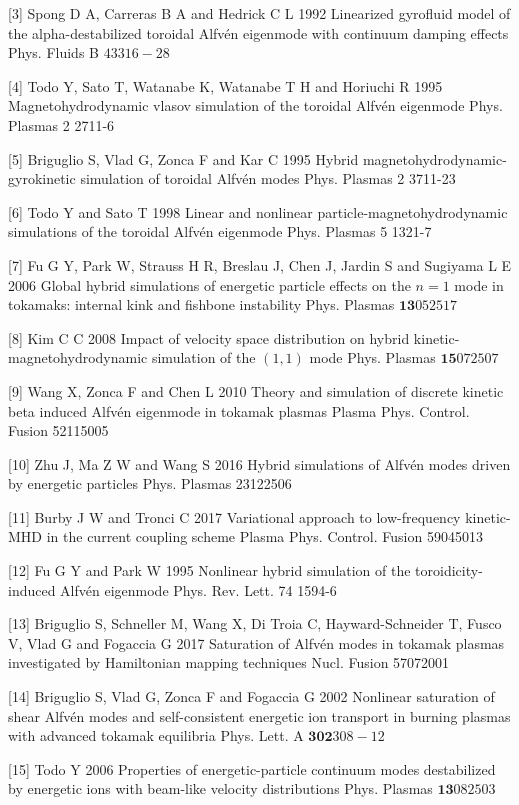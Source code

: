 \documentclass[10pt]{article}
\begin{document}
[3] Spong D A, Carreras B A and Hedrick C L 1992 Linearized gyrofluid model of the alpha-destabilized toroidal Alfvén eigenmode with continuum damping effects Phys. Fluids B $43316-28$

[4] Todo Y, Sato T, Watanabe K, Watanabe T H and Horiuchi R 1995 Magnetohydrodynamic vlasov simulation of the toroidal Alfvén eigenmode Phys. Plasmas 2 2711-6

[5] Briguglio S, Vlad G, Zonca F and Kar C 1995 Hybrid magnetohydrodynamic-gyrokinetic simulation of toroidal Alfvén modes Phys. Plasmas 2 3711-23

[6] Todo Y and Sato T 1998 Linear and nonlinear particle-magnetohydrodynamic simulations of the toroidal Alfvén eigenmode Phys. Plasmas 5 1321-7

[7] Fu G Y, Park W, Strauss H R, Breslau J, Chen J, Jardin S and Sugiyama L E 2006 Global hybrid simulations of energetic particle effects on the $n=1$ mode in tokamaks: internal kink and fishbone instability Phys. Plasmas $\mathbf{1 3} 052517$

[8] Kim C C 2008 Impact of velocity space distribution on hybrid kinetic-magnetohydrodynamic simulation of the $(1,1)$ mode Phys. Plasmas $\mathbf{1 5} 072507$

[9] Wang X, Zonca F and Chen L 2010 Theory and simulation of discrete kinetic beta induced Alfvén eigenmode in tokamak plasmas Plasma Phys. Control. Fusion 52115005

[10] Zhu J, Ma Z W and Wang S 2016 Hybrid simulations of Alfvén modes driven by energetic particles Phys. Plasmas 23122506

[11] Burby J W and Tronci C 2017 Variational approach to low-frequency kinetic-MHD in the current coupling scheme Plasma Phys. Control. Fusion 59045013

[12] Fu G Y and Park W 1995 Nonlinear hybrid simulation of the toroidicity-induced Alfvén eigenmode Phys. Rev. Lett. 74 1594-6

[13] Briguglio S, Schneller M, Wang X, Di Troia C, Hayward-Schneider T, Fusco V, Vlad G and Fogaccia G 2017 Saturation of Alfvén modes in tokamak plasmas investigated by Hamiltonian mapping techniques $\mathrm{Nucl}$. Fusion 57072001

[14] Briguglio S, Vlad G, Zonca F and Fogaccia G 2002 Nonlinear saturation of shear Alfvén modes and self-consistent energetic ion transport in burning plasmas with advanced tokamak equilibria Phys. Lett. A $\mathbf{3 0 2} 308-12$

[15] Todo Y 2006 Properties of energetic-particle continuum modes destabilized by energetic ions with beam-like velocity distributions Phys. Plasmas $\mathbf{1 3} 082503$
\end{document}
